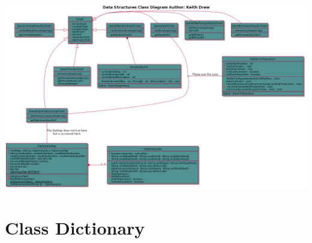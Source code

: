 \documentclass[11pt]{article}
\begin{document}
\includegraphics[width=\linewidth]{dataDiagram.png}


\section{Class Dictionary}
\label{sec-1}
\end{document}

